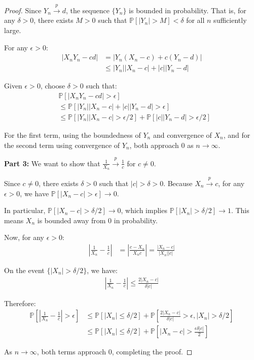\begin{proof}
    Since $Y_n \xrightarrow{p} d$, the sequence $\{Y_n\}$ is bounded in probability. That is, for any $\delta > 0$, there exists $M > 0$ such that $\mathbb{P}[|Y_n| > M] < \delta$ for all $n$ sufficiently large.
    
    For any $\epsilon > 0$:
    \begin{align*}
        |X_n Y_n - cd| &= |Y_n(X_n - c) + c(Y_n - d)| \\
        &\leq |Y_n||X_n - c| + |c||Y_n - d|
    \end{align*}
    
    Given $\epsilon > 0$, choose $\delta > 0$ such that:
    \begin{align*}
        &\mathbb{P}[|X_n Y_n - cd| > \epsilon] \\
        &\leq \mathbb{P}[|Y_n||X_n - c| + |c||Y_n - d| > \epsilon] \\
        &\leq \mathbb{P}[|Y_n||X_n - c| > \epsilon/2] + \mathbb{P}[|c||Y_n - d| > \epsilon/2]
    \end{align*}
    
    For the first term, using the boundedness of $Y_n$ and convergence of $X_n$, and for the second term using convergence of $Y_n$, both approach 0 as $n \to \infty$.
    
    \textbf{Part 3:} We want to show that $\frac{1}{X_n} \xrightarrow{p} \frac{1}{c}$ for $c \neq 0$.
    
    Since $c \neq 0$, there exists $\delta > 0$ such that $|c| > \delta > 0$. Because $X_n \xrightarrow{p} c$, for any $\epsilon > 0$, we have $\mathbb{P}[|X_n - c| > \epsilon] \to 0$.
    
    In particular, $\mathbb{P}[|X_n - c| > \delta/2] \to 0$, which implies $\mathbb{P}[|X_n| > \delta/2] \to 1$. This means $X_n$ is bounded away from 0 in probability.
    
    Now, for any $\epsilon > 0$:
    \begin{align*}
        \left|\frac{1}{X_n} - \frac{1}{c}\right| &= \left|\frac{c - X_n}{X_n c}\right| = \frac{|X_n - c|}{|X_n||c|}
    \end{align*}
    
    On the event $\{|X_n| > \delta/2\}$, we have:
    \begin{align*}
        \left|\frac{1}{X_n} - \frac{1}{c}\right| \leq \frac{2|X_n - c|}{\delta|c|}
    \end{align*}
    
    Therefore:
    \begin{align*}
        \mathbb{P}\left[\left|\frac{1}{X_n} - \frac{1}{c}\right| > \epsilon\right] &\leq \mathbb{P}[|X_n| \leq \delta/2] + \mathbb{P}\left[\frac{2|X_n - c|}{\delta|c|} > \epsilon, |X_n| > \delta/2\right] \\
        &\leq \mathbb{P}[|X_n| \leq \delta/2] + \mathbb{P}\left[|X_n - c| > \frac{\epsilon\delta|c|}{2}\right]
    \end{align*}
    
    As $n \to \infty$, both terms approach 0, completing the proof.
\end{proof}

